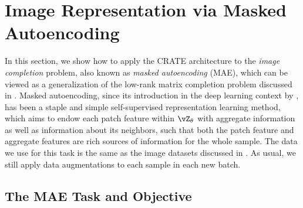\documentclass[../../book-main.tex]{subfiles}
\begin{document}
\section{Image Representation via Masked Autoencoding}\label{sec:image_completion}

In this section, we show how to apply the CRATE architecture to the
\textit{image completion} problem, also known as \textit{masked
autoencoding} (MAE), which can be viewed as a generalization of the
low-rank matrix completion problem discussed in .
Masked autoencoding, since its introduction in the deep learning
context by \citet{he2022masked}, has been a staple and simple
self-supervised representation learning method, which aims to endow
each patch feature within \(\vZ_{\theta}\) with aggregate information
as well as information about its neighbors, such that both the patch
feature and aggregate features are rich sources of information for
the whole sample.
The data we use for this task is the same as the image datasets
discussed in . As usual, we still
apply data augmentations to each sample in each new batch.

\subsection{The MAE Task and Objective}\label{sub:image_completion_objective}
\end{document}
